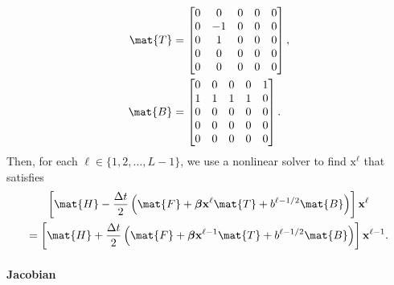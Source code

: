 \documentclass{jpmarticle}
\renewcommand{\vec}[1]{\boldsymbol{\mathrm{#1}}}
\let\subequationsorig\subequations%
\let\endsubequationsorig\endsubequations%
\renewenvironment{subequations}{
  \subequationsorig
  \renewcommand{\theequation}{\theparentequation.\arabic{equation}}
}{
  \endsubequationsorig
}
\begin{document}
\begin{subequations}
\begin{align}
    \mat{T} &=
    \begin{bmatrix}
      0 & 0 & 0 & 0 & 0 \\
      0 & -1 & 0 & 0 & 0 \\
      0 & 1 & 0 & 0 & 0 \\
      0 & 0 & 0 & 0 & 0 \\
      0 & 0 & 0 & 0 & 0
    \end{bmatrix},
    \\
    \mat{B} &=
    \begin{bmatrix}
      0 & 0 & 0 & 0 & 1 \\
      1 & 1 & 1 & 1 & 0 \\
      0 & 0 & 0 & 0 & 0 \\
      0 & 0 & 0 & 0 & 0 \\
      0 & 0 & 0 & 0 & 0
    \end{bmatrix}.
  \end{align}
  Then, for each $\ell \in \{1, 2, \ldots, L - 1\}$,
  we use a nonlinear solver to find $\vec{x}^{\ell}$ that satisfies
  \begin{multline}
    \label{step_unstructured}
    \left[
      \mat{H}
      - \frac{\Delta t}{2}
      \left(
        \mat{F}
        + \vec{\beta} \vec{x}^{\ell} \mat{T}
        + b^{\ell - 1 / 2} \mat{B}
      \right)
    \right]
    \vec{x}^{\ell}
    \\
    =
    \left[
      \mat{H}
      + \frac{\Delta t}{2}
      \left(
        \mat{F}
        + \vec{\beta} \vec{x}^{\ell - 1} \mat{T}
        + b^{\ell - 1 / 2} \mat{B}
      \right)
    \right]
    \vec{x}^{\ell - 1}.
  \end{multline}
\end{subequations}


\paragraph{Jacobian}
\end{document}
